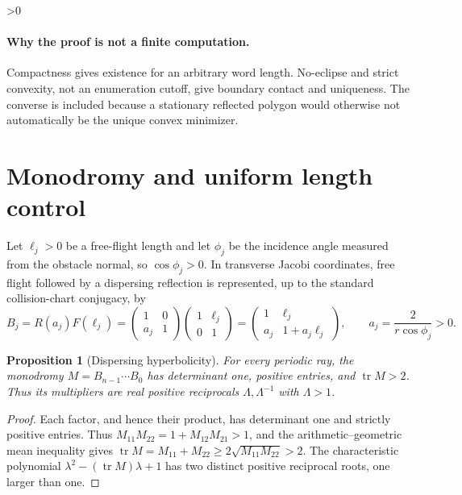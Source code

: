 \documentclass[10pt]{article}
\providecommand{\CRevisionRound}{2}
\newtheorem{proposition}{Proposition}
\newcommand{\tr}{\operatorname{tr}}
\begin{document}
\ifnum\CRevisionRound>0
\paragraph{Why the proof is not a finite computation.}
Compactness gives existence for an arbitrary word length.  No-eclipse and
strict convexity, not an enumeration cutoff, give boundary contact and
uniqueness.  The converse is included because a stationary reflected polygon
would otherwise not automatically be the unique convex minimizer.

\section{Monodromy and uniform length control}
Let $\ell_j>0$ be a free-flight length and let $\phi_j$ be the incidence
angle measured from the obstacle normal, so $\cos\phi_j>0$.  In transverse
Jacobi coordinates, free flight followed by a dispersing reflection is
represented, up to the standard collision-chart conjugacy, by
\begin{equation}\label{eq:block}
 B_j=R(a_j)F(\ell_j)
 =\begin{pmatrix}1&0\\a_j&1\end{pmatrix}
  \begin{pmatrix}1&\ell_j\\0&1\end{pmatrix}
 =\begin{pmatrix}1&\ell_j\\a_j&1+a_j\ell_j\end{pmatrix},
 \qquad a_j=\frac{2}{r\cos\phi_j}>0.
\end{equation}

\begin{proposition}[Dispersing hyperbolicity]\label{prop:hyp}
For every periodic ray, the monodromy
$M=B_{n-1}\cdots B_0$ has determinant one, positive entries, and
$\tr M>2$.  Thus its multipliers are real positive reciprocals
$\Lambda,\Lambda^{-1}$ with $\Lambda>1$.
\end{proposition}
\begin{proof}
Each factor, and hence their product, has determinant one and strictly
positive entries.  Thus
$M_{11}M_{22}=1+M_{12}M_{21}>1$, and the arithmetic--geometric mean
inequality gives
$\tr M=M_{11}+M_{22}\ge2\sqrt{M_{11}M_{22}}>2$.  The characteristic polynomial
$\lambda^2-(\tr M)\lambda+1$ has two distinct positive reciprocal roots,
one larger than one.
\end{proof}
\end{document}
